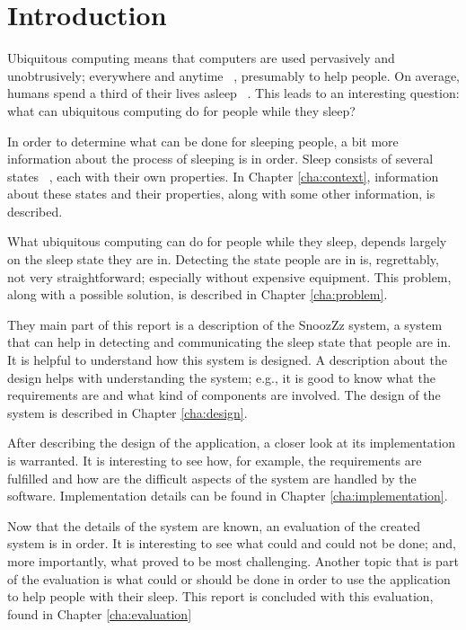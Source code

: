 \chapter{Introduction} %
\label{cha:introduction}
Ubiquitous computing means that computers are used pervasively and unobtrusively; everywhere and anytime ~\cite{Weiser:1993:UC:618984.619973}, presumably to help people. On average, humans spend a third of their lives asleep ~\cite{Lauderdale:2006:Am-J-Epidemiol:16740591}. This leads to an interesting question: what can ubiquitous computing do for people while they sleep? 

In order to determine what can be done for sleeping people, a bit more information about the process of sleeping is in order. Sleep consists of several states ~\cite{Silber:2007fk}, each with their own properties. In Chapter \ref{cha:context}, information about these states and their properties, along with some other information, is described.

What ubiquitous computing can do for people while they sleep, depends largely on the sleep state they are in. Detecting the state people are in is, regrettably, not very straightforward; especially without expensive equipment. This problem, along with a possible solution, is described in Chapter \ref{cha:problem}.

They main part of this report is a description of the SnoozZz system, a system that can help in detecting and communicating the sleep state that people are in. It is helpful to understand how this system is designed. A description about the design helps with understanding the system; e.g., it is good to know what the requirements are and what kind of components are involved. The design of the system is described in Chapter \ref{cha:design}.

After describing the design of the application, a closer look at its implementation is warranted. It is interesting to see how, for example, the requirements are fulfilled and how are the difficult aspects of the system are handled by the software. Implementation details can be found in Chapter \ref{cha:implementation}.

Now that the details of the system are known, an evaluation of the created system is in order. It is interesting to see what could and could not be done; and, more importantly, what proved to be most challenging. Another topic that is part of the evaluation is what could or should be done in order to use the application to help people with their sleep. This report is concluded with this evaluation, found in Chapter \ref{cha:evaluation}
